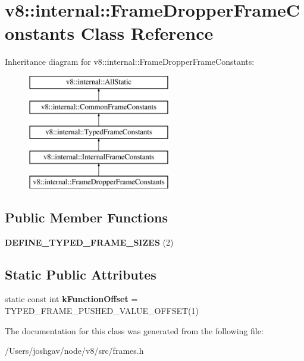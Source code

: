 \hypertarget{classv8_1_1internal_1_1_frame_dropper_frame_constants}{}\section{v8\+:\+:internal\+:\+:Frame\+Dropper\+Frame\+Constants Class Reference}
\label{classv8_1_1internal_1_1_frame_dropper_frame_constants}
Inheritance diagram for v8\+:\+:internal\+:\+:Frame\+Dropper\+Frame\+Constants\+:\begin{figure}[H]
\begin{center}
\leavevmode
\includegraphics[height=5.000000cm]{classv8_1_1internal_1_1_frame_dropper_frame_constants}
\end{center}
\end{figure}
\subsection*{Public Member Functions}
\begin{DoxyCompactItemize}
\item 
{\bfseries D\+E\+F\+I\+N\+E\+\_\+\+T\+Y\+P\+E\+D\+\_\+\+F\+R\+A\+M\+E\+\_\+\+S\+I\+Z\+ES} (2)\hypertarget{classv8_1_1internal_1_1_frame_dropper_frame_constants_a3de400e5dee398de579213e78d506991}{}\label{classv8_1_1internal_1_1_frame_dropper_frame_constants_a3de400e5dee398de579213e78d506991}

\end{DoxyCompactItemize}
\subsection*{Static Public Attributes}
\begin{DoxyCompactItemize}
\item 
static const int {\bfseries k\+Function\+Offset} = T\+Y\+P\+E\+D\+\_\+\+F\+R\+A\+M\+E\+\_\+\+P\+U\+S\+H\+E\+D\+\_\+\+V\+A\+L\+U\+E\+\_\+\+O\+F\+F\+S\+ET(1)\hypertarget{classv8_1_1internal_1_1_frame_dropper_frame_constants_a5da56f2702051808f7739eb0b4d10590}{}\label{classv8_1_1internal_1_1_frame_dropper_frame_constants_a5da56f2702051808f7739eb0b4d10590}

\end{DoxyCompactItemize}


The documentation for this class was generated from the following file\+:\begin{DoxyCompactItemize}
\item 
/\+Users/joshgav/node/v8/src/frames.\+h\end{DoxyCompactItemize}
